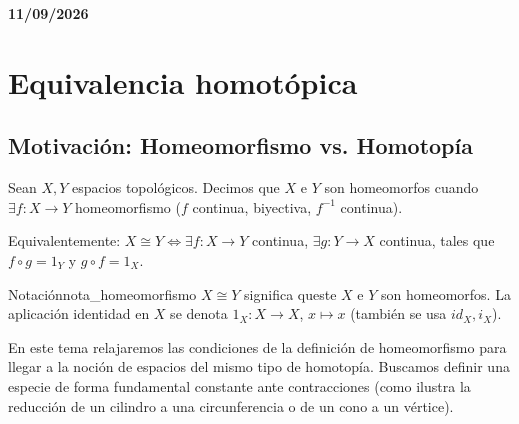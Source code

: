 \textbf{11/09/2026}
\section{Equivalencia homotópica}

\subsection{Motivación: Homeomorfismo vs. Homotopía}

Sean $X, Y$ espacios topológicos. Decimos que $X$ e $Y$ son homeomorfos cuando $\exists f \colon X \to Y$ homeomorfismo ($f$ continua, biyectiva, $f^{-1}$ continua).

Equivalentemente: $X \cong Y \iff \exists f \colon X \to Y$ continua, $\exists g \colon Y \to X$ continua, tales que $f \circ g = 1_Y$ y $g \circ f = 1_X$.

\begin{nota}{Notación}{nota_homeomorfismo}
$X \cong Y$ significa queste $X$ e $Y$ son homeomorfos. La aplicación identidad en $X$ se denota $1_X \colon X \to X$, $x \mapsto x$ (también se usa $id_X, i_X$).
\end{nota}

En este tema relajaremos las condiciones de la definición de homeomorfismo para llegar a la noción de espacios del mismo tipo de homotopía. Buscamos definir una especie de forma fundamental constante ante contracciones (como ilustra la reducción de un cilindro a una circunferencia o de un cono a un vértice).

\begin{center}
\end{center}

